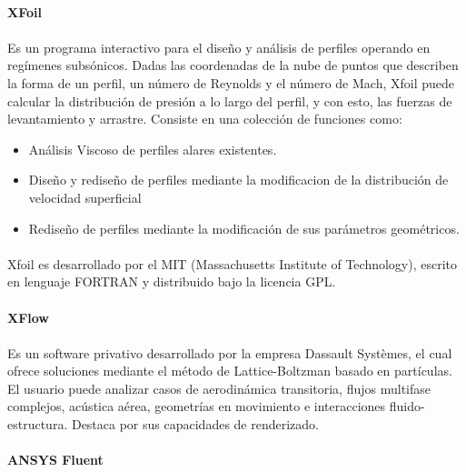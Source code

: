 \documentclass[letterpaper, openright, 12pt]{book}
\begin{document}
				\paragraph*{XFoil}
				\paragraph*{}
					Es un programa interactivo para el diseño y análisis de perfiles operando en regímenes subsónicos. Dadas las coordenadas de la nube de puntos que describen la forma de un perfil, un número de Reynolds y el número de Mach, Xfoil puede calcular la distribución de presión a lo largo del perfil, y con esto, las fuerzas de levantamiento y arrastre.
					Consiste en una colección de funciones como:
					\begin{itemize}
						\item Análisis Viscoso de perfiles alares existentes.
						\item Diseño y rediseño de perfiles mediante la modificacion de la distribución de velocidad superficial
						\item Rediseño de perfiles mediante la modificación de sus parámetros geométricos.
					\end{itemize}
				\cite{xfoil}
				\paragraph*{}
					Xfoil es desarrollado por el MIT (Massachusetts Institute of Technology), escrito en lenguaje FORTRAN y distribuido bajo la licencia GPL.
				
				\paragraph*{XFlow}
				\paragraph*{}
					Es un software privativo desarrollado por la empresa Dassault Systèmes, el cual ofrece soluciones mediante el método de Lattice-Boltzman basado en partículas. El usuario puede analizar casos de aerodinámica transitoria, flujos multifase complejos, acústica aérea, geometrías en movimiento e interacciones fluido-estructura. Destaca por sus capacidades de renderizado.\cite{xflow}
				
				\paragraph*{ANSYS Fluent}
\end{document}
